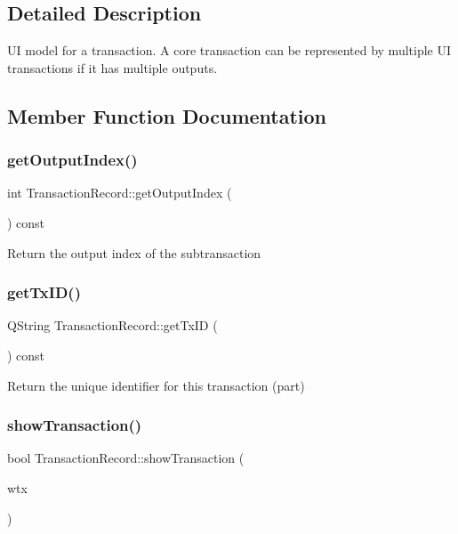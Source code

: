 \subsection{Detailed Description}
UI model for a transaction. A core transaction can be represented by multiple UI transactions if it has multiple outputs. 

\subsection{Member Function Documentation}
\mbox{\label{class_transaction_record_a51d9d52d92a57448ab9b237e968c5ff6}} 
\subsubsection{\texorpdfstring{getOutputIndex()}{getOutputIndex()}}
{\footnotesize\ttfamily int Transaction\+Record\+::get\+Output\+Index (\begin{DoxyParamCaption}{ }\end{DoxyParamCaption}) const}

Return the output index of the subtransaction \mbox{\label{class_transaction_record_a838d881f68f967b751e7f7707bccfffa}} 
\subsubsection{\texorpdfstring{getTxID()}{getTxID()}}
{\footnotesize\ttfamily Q\+String Transaction\+Record\+::get\+Tx\+ID (\begin{DoxyParamCaption}{ }\end{DoxyParamCaption}) const}

Return the unique identifier for this transaction (part) \mbox{\label{class_transaction_record_a5ad1d1af4bec5b15a624b7a451e8cdbf}} 
\subsubsection{\texorpdfstring{showTransaction()}{showTransaction()}}
{\footnotesize\ttfamily bool Transaction\+Record\+::show\+Transaction (\begin{DoxyParamCaption}\item[{const \mbox{\hyperlink{class_c_wallet_tx}{C\+Wallet\+Tx}} \&}]{wtx }\end{DoxyParamCaption})\hspace{0.3cm}{\ttfamily [static]}}

